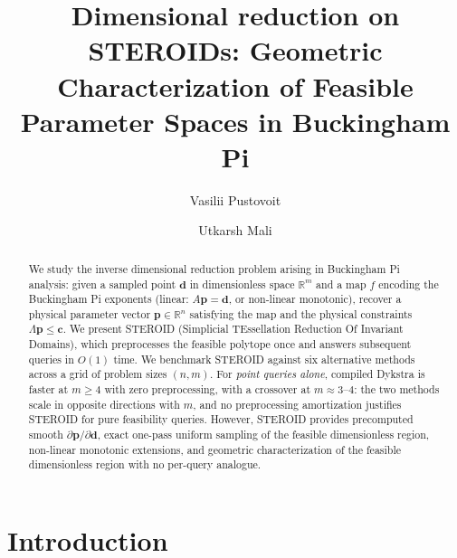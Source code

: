 \documentclass[review,onefignum,onetabnum]{./SIAM_template/siamart171218}
\author{Vasilii Pustovoit \and Utkarsh Mali \and \note{co-authors?}}
\title{Dimensional reduction on STEROIDs: Geometric Characterization of Feasible 
Parameter Spaces in Buckingham Pi}
\begin{document}
\maketitle

\begin{abstract}
	We study the inverse dimensional reduction problem arising in Buckingham Pi analysis:
	given a sampled point $\mathbf{d}$ in dimensionless space $\mathbb{R}^m$ and a map
	$f$ encoding the Buckingham Pi exponents (linear: $A\mathbf{p}=\mathbf{d}$, or
	non-linear monotonic), recover a physical parameter vector $\mathbf{p} \in \mathbb{R}^n$
	satisfying the map and the physical constraints $\Lambda\mathbf{p} \leq \mathbf{c}$.
	We present STEROID (Simplicial TEssellation Reduction Of Invariant Domains), which
	preprocesses the feasible polytope once and answers subsequent queries in $O(1)$ time.
	We benchmark STEROID against six alternative methods across a grid of problem sizes
	$(n, m)$.  For \emph{point queries alone}, compiled Dykstra is faster
	at $m \geq 4$ with zero preprocessing, with a crossover at $m \approx 3$--$4$:
	the two methods scale in opposite directions with $m$, and no preprocessing
	amortization justifies STEROID for pure feasibility queries.
	However, STEROID provides precomputed smooth $\partial\mathbf{p}/\partial\mathbf{d}$,
	exact one-pass uniform sampling of the feasible dimensionless region,
	non-linear monotonic extensions, and geometric characterization of the feasible
	dimensionless region with no per-query analogue.
\end{abstract}

\section{Introduction}
\label{sec:intro}
\end{document}
